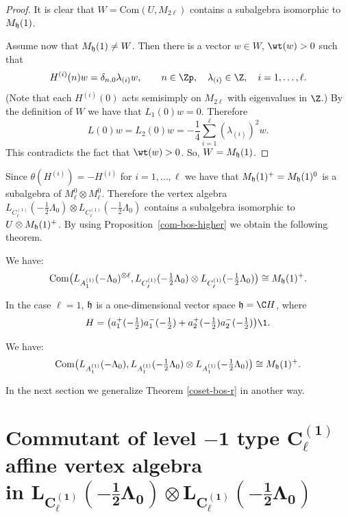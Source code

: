 \documentclass[pdftex]{sigma}
\begin{document}
\begin{proof}
It is clear that
 $W= \mbox{Com} ( U, M_{2\ell})$ contains a subalgebra isomorphic to $M_{\frak h}
(1)$.

Assume now that $M_{\frak h} (1) \ne W$. Then there is a vector
$ w \in W$, ${\wt} (w) > 0$ such that
\[ H ^{(i)}(n) w =  \delta_{n,0} \lambda _{(i)} w, \qquad n \in {\Zp},
\quad \lambda _{(i)} \in {\Z}, \quad i = 1, \dots, \ell.
\]
(Note that each  $H^{(i)}(0)$ acts semisimply on $M_{2\ell}$ with
eigenvalues in ${\Z}$.)
By the def\/inition of $W$ we have that $L_1 (0) w = 0$. Therefore
\[ L(0) w = L_2(0) w = - \frac{1}{4} \sum_{i = 1 } ^{\ell} (\lambda
_{(i)})  ^2 w. \] This contradicts the fact that $\wt (w) > 0$. So,
$W= M_{\frak h} (1)$.
\end{proof}


Since $\theta (H^{(i)}) = -H^{(i)}$ for $i=1, \dots, \ell$ we have
that $M_{\frak h} (1)^+ =M_{\frak h}(1) ^0$ is a subalgebra of
$M_{\ell} ^0 \otimes M_{\ell} ^0$.
 Therefore the  vertex algebra $L_{C_{\ell} ^{(1)}}(-\tfrac{1}{2}\Lambda_0) \otimes L_{C_{\ell} ^{(1)}}(-\tfrac{1}{2}\Lambda_0)$ contains a subalgebra isomorphic
to $U \otimes M_{\frak h} (1) ^+$. By using Proposition~\ref{com-bos-higher} we obtain the following theorem.

\begin{theorem} \label{coset-bos-r-higher}We have:
\[ {\rm Com} \big( L_{A_1 ^{(1)}}(- \Lambda_0) ^{\otimes
\ell},L_{C_{\ell} ^{(1)}}(-\tfrac{1}{2}\Lambda_0) \otimes
L_{C_{\ell} ^{(1)}}(-\tfrac{1}{2}\Lambda_0) \big) \cong M_{\frak h} (1)
^+.\]
\end{theorem}

In the case $\ell =1$, ${\frak h}$ is a one-dimensional vector space
${\frak h}= {\C} H$, where
\[ H = \big(a_1 ^+ (-\tfrac{1}{2}) a_1 ^-
(-\tfrac{1}{2})+a_2 ^+ (-\tfrac{1}{2}) a_2 ^- (-\tfrac{1}{2}) \big)
{\1}.\]

\begin{theorem} \label{coset-bos-r} We have:
\[ {\rm Com} \big( L_{A_1 ^{(1)}}(-\Lambda_0),L_{A_1
^{(1)}}(-\tfrac{1}{2}\Lambda_0) \otimes L_{A_1
^{(1)}}(-\tfrac{1}{2}\Lambda_0) \big) \cong M_{\frak h} (1) ^+.
\]
\end{theorem}

In the next section we generalize Theorem \ref{coset-bos-r} in
another way.

\section[Commutant of level $-1$ type $C_{\ell} ^{(1)}$  affine vertex algebra in  $L_{C_{\ell} ^{(1)}}(-\frac{1}{2}\Lambda_0)
\otimes L_{C_{\ell} ^{(1)}}(-\frac{1}{2}\Lambda_0)$]{Commutant of level $\boldsymbol{-1}$ type $\boldsymbol{C_{\ell} ^{(1)}}$
af\/f\/ine vertex algebra\\ in  $\boldsymbol{L_{C_{\ell} ^{(1)}}(-\frac{1}{2}\Lambda_0)
\otimes L_{C_{\ell} ^{(1)}}(-\frac{1}{2}\Lambda_0)}$}
\end{document}
